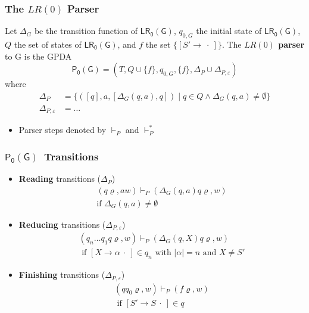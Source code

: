 \documentclass{beamer}
\newcommand{\concept}[1]{\textbf{#1}}
\newcommand{\cfitem}[3]{\ensuremath{{[#1 \to #2 \:\cdot\: #3]}}}
\newcommand{\lrdfa}{\ensuremath{\mathsf{LR_0(G)}}}
\newcommand{\parser}{\ensuremath{\mathsf{P_0(G)}}}
\begin{document}
\begin{frame}
  \frametitle{The $LR(0)$ Parser}
  \begin{definition}
    Let $\varDelta_G$ be the transition function of \lrdfa, $q_{0,G}$ the initial
    state of \lrdfa, $Q$ the set of states of \lrdfa, and $f$ the set
    $\{\cfitem{S'}{}{}\}$. The \concept{$LR(0)$ parser} to G is the 
    GPDA 
    \[ \parser = (T, Q \cup \{f\}, q_{0,G}, \{f\}, \varDelta_P \cup \varDelta_{P,\varepsilon})\]
    where
    \begin{align*}
      \varDelta_P &= \{([q], a, [\varDelta_G(q,a), q])
        \mid q \in Q \land \varDelta_G(q,a) \neq \emptyset\}\\
      \varDelta_{P,\varepsilon} &= \ldots
    \end{align*}
  \end{definition}
  \begin{itemize}
    \item Parser steps denoted by $\vdash_P$ and $\vdash_P^*$
  \end{itemize}
\end{frame}

\begin{frame}
  \frametitle{\parser\ Transitions}
  \begin{itemize}
    \item \concept{Reading} transitions ($\varDelta_P$)
    \begin{gather*}
    (q \varrho, aw) \vdash_P (\varDelta_G(q, a) q \varrho, w)\\
    \text{if } \varDelta_G(q, a) \neq \emptyset
    \end{gather*}
    \item \concept{Reducing} transitions ($\varDelta_{P, \varepsilon}$)
    \begin{gather*}
    (q_n \ldots q_1 q \varrho, w) \vdash_P (\varDelta_G(q, X) q \varrho, w)\\
    \text{ if } \cfitem{X}{\alpha}{} \in q_n \text{ with } |\alpha| = n
    \text{ and } X \neq S'
    \end{gather*}
    \item \concept{Finishing} transitions ($\varDelta_{P, \varepsilon}$)
    \begin{gather*}
      (q q_0 \varrho, w) \vdash_P (f \varrho, w)\\
      \text{ if } \cfitem{S'}{S}{} \in q
    \end{gather*}
  \end{itemize}
\end{frame}
\end{document}
